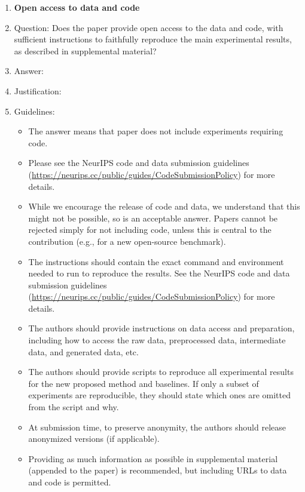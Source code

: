 \documentclass{article}
\theoremstyle{definition}
\begin{document}
\begin{enumerate}
\item {\bf Open access to data and code}
    \item[] Question: Does the paper provide open access to the data and code, with sufficient instructions to faithfully reproduce the main experimental results, as described in supplemental material?
    \item[] Answer: \answerTODO{} \item[] Justification: \justificationTODO{}
    \item[] Guidelines:
    \begin{itemize}
        \item The answer \answerNA{} means that paper does not include experiments requiring code.
        \item Please see the NeurIPS code and data submission guidelines (\url{https://neurips.cc/public/guides/CodeSubmissionPolicy}) for more details.
        \item While we encourage the release of code and data, we understand that this might not be possible, so \answerNo{} is an acceptable answer. Papers cannot be rejected simply for not including code, unless this is central to the contribution (e.g., for a new open-source benchmark).
        \item The instructions should contain the exact command and environment needed to run to reproduce the results. See the NeurIPS code and data submission guidelines (\url{https://neurips.cc/public/guides/CodeSubmissionPolicy}) for more details.
        \item The authors should provide instructions on data access and preparation, including how to access the raw data, preprocessed data, intermediate data, and generated data, etc.
        \item The authors should provide scripts to reproduce all experimental results for the new proposed method and baselines. If only a subset of experiments are reproducible, they should state which ones are omitted from the script and why.
        \item At submission time, to preserve anonymity, the authors should release anonymized versions (if applicable).
        \item Providing as much information as possible in supplemental material (appended to the paper) is recommended, but including URLs to data and code is permitted.
    \end{itemize}



\end{enumerate}
\end{document}
